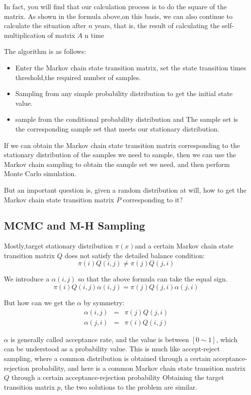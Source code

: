 In fact, you will find that our calculation process is to do the square of the matrix. As shown in the formula above,on this basis, we can also continue to calculate the situation after $n$ years, that is, the result of calculating the self-multiplication of matrix $A$ n time

The algorithm is as follows:
\begin{itemize}
  \item Enter the Markov chain state transition matrix, set the state transition times threshold,the required number of samples.
  \item Sampling from any simple probability distribution to get the initial state value.
  \item sample  from the conditional probability distribution and The sample set is the corresponding sample set that meets our stationary distribution.
\end{itemize}

If we can obtain the Markov chain state transition matrix corresponding to the stationary distribution of the samples we need to sample, then we can use the Markov chain sampling to obtain the sample set we need, and then perform Monte Carlo simulation.

But an important question is, given a random distribution at will, how to get the Markov chain state transition matrix $P$ corresponding to it?

\subsection{MCMC  and M-H Sampling}
Mostly,target stationary distribution $\pi(x)$and a certain Markov chain state transition matrix $Q$ does not satisfy the detailed balance condition:
\[
  \pi(i)Q(i,j) \neq \pi(j)Q(j,i)
\]


We introduce a $\alpha(i,j)$ so that the above formula can take the equal sign.
\[
  \pi(i)Q(i,j)\alpha(i,j) = \pi(j)Q(j,i)\alpha(j,i)
\]

But how can we get the $\alpha$ by symmetry:
\begin{eqnarray*}
\alpha(i,j) &=& \pi(j)Q(j,i)\\
\alpha(j,i) &=& \pi(i)Q(i,j)
\end{eqnarray*}


$\alpha$ is generally called acceptance rate, and the value is between $[0  \sim 1]$, which can be understood as a probability value. This is much like accept-reject sampling, where a common distribution is obtained through a certain acceptance-rejection probability, and here is a common Markov chain state transition matrix $Q$ through a certain acceptance-rejection probability Obtaining the target transition matrix $p$, the two solutions to the problem are similar\cite{mh}.


